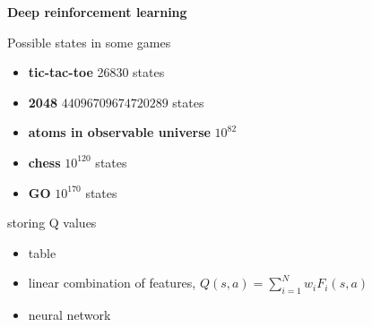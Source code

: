 \documentclass[xcolor=dvipsnames]{beamer}
\begin{document}
\begin{frame}{\bf Deep reinforcement learning}

Possible states in some games \\

\begin{itemize}
 \item {\bf tic-tac-toe} 26830 states\\
 \item {\bf 2048}  $44 096 709 674 720 289$ states \\
 \item {\bf atoms in observable universe} $10^{82}$
 \item {\bf chess} $10^{120}$ states \\
 \item {\bf GO} $10^{170}$ states \\
\end{itemize}


storing Q values

\begin{itemize}
 \item table \\
 \item linear combination of features, $ Q(s, a) = \sum_{i=1}^{N} w_iF_i(s, a) $
 \item neural network
\end{itemize}


\end{frame}
\end{document}
